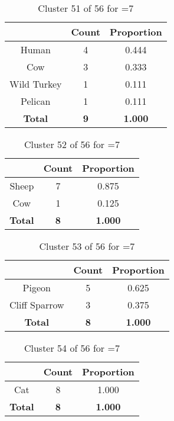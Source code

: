 \begin{table}[ht!]
\centering
\begin{tabular}{|c|c|c|}
\hline
\bf \Spec{} &\bf Count &\bf Proportion\\ \hline \hline
Human & 4 & 0.444\\ \hline
Cow & 3 & 0.333\\ \hline
Wild Turkey & 1 & 0.111\\ \hline
Pelican & 1 & 0.111\\ \hline
\hline
\bf Total & \bf 9 & \bf 1.000\\ \hline
\end{tabular}
\label{tab:cluster:51:7}
\caption{Cluster 51 of 56 for \minneigh{}=7}
\end{table}

\begin{table}[ht!]
\centering
\begin{tabular}{|c|c|c|}
\hline
\bf \Spec{} &\bf Count &\bf Proportion\\ \hline \hline
Sheep & 7 & 0.875\\ \hline
Cow & 1 & 0.125\\ \hline
\hline
\bf Total & \bf 8 & \bf 1.000\\ \hline
\end{tabular}
\label{tab:cluster:52:7}
\caption{Cluster 52 of 56 for \minneigh{}=7}
\end{table}

\begin{table}[ht!]
\centering
\begin{tabular}{|c|c|c|}
\hline
\bf \Spec{} &\bf Count &\bf Proportion\\ \hline \hline
Pigeon & 5 & 0.625\\ \hline
Cliff Sparrow & 3 & 0.375\\ \hline
\hline
\bf Total & \bf 8 & \bf 1.000\\ \hline
\end{tabular}
\label{tab:cluster:53:7}
\caption{Cluster 53 of 56 for \minneigh{}=7}
\end{table}

\begin{table}[ht!]
\centering
\begin{tabular}{|c|c|c|}
\hline
\bf \Spec{} &\bf Count &\bf Proportion\\ \hline \hline
Cat & 8 & 1.000\\ \hline
\hline
\bf Total & \bf 8 & \bf 1.000\\ \hline
\end{tabular}
\label{tab:cluster:54:7}
\caption{Cluster 54 of 56 for \minneigh{}=7}
\end{table}


